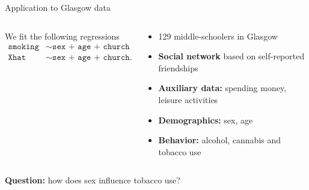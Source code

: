 \documentclass[aspectratio=169]{beamer}
\theoremstyle{remark}
\begin{document}
\begin{frame}{Application to Glasgow data}
    \begin{columns}
        \centering
        \begin{column}{0.55\textwidth}
            We fit the following regressions
            \vspace{2mm}
            \begin{equation*}
                \begin{aligned}
                    \texttt{smoking} & \sim \texttt{sex + age + church + Xhat} \\
                    \texttt{Xhat}    & \sim \texttt{sex + age + church}.
                \end{aligned}
            \end{equation*}
        \end{column}
        \begin{column}{0.5\textwidth}
            \begin{itemize}
                \item 129 middle-schoolers in Glasgow
                \item {\bf Social network} based on self-reported friendships
                \item {\bf Auxiliary data:} spending money, leisure activities
                \item {\bf Demographics:} sex, age
                \item {\bf Behavior:} alcohol, cannabis and tobacco use
            \end{itemize}
        \end{column}
    \end{columns}
    \vspace{2mm}
    \centering
    \textbf{Question:} how does sex influence tobacco use?
\end{frame}
\end{document}
